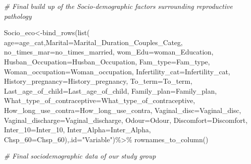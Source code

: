 \documentclass[
]{article}
\newenvironment{Shaded}{\begin{snugshade}}{\end{snugshade}}
\newcommand{\AttributeTok}[1]{\textcolor[rgb]{0.77,0.63,0.00}{#1}}
\newcommand{\CommentTok}[1]{\textcolor[rgb]{0.56,0.35,0.01}{\textit{#1}}}
\newcommand{\FunctionTok}[1]{\textcolor[rgb]{0.00,0.00,0.00}{#1}}
\newcommand{\NormalTok}[1]{#1}
\newcommand{\OtherTok}[1]{\textcolor[rgb]{0.56,0.35,0.01}{#1}}
\newcommand{\SpecialCharTok}[1]{\textcolor[rgb]{0.00,0.00,0.00}{#1}}
\newcommand{\StringTok}[1]{\textcolor[rgb]{0.31,0.60,0.02}{#1}}
\begin{document}
\begin{Shaded}
\begin{Highlighting}[]
\CommentTok{\# Final build up of the Socio{-}demographic factors surrounding reproductive pathology}

\NormalTok{Socio\_eco}\OtherTok{\textless{}{-}}\FunctionTok{bind\_rows}\NormalTok{(}\FunctionTok{list}\NormalTok{(}
  \AttributeTok{age=}\NormalTok{age\_cat,}\AttributeTok{Marital=}\NormalTok{Marital\_Duration\_Couples\_Categ,}
  \AttributeTok{no\_times\_mar=}\NormalTok{no\_times\_married,}
  \AttributeTok{wom\_Edu=}\NormalTok{woman\_Education,}
  \AttributeTok{Husban\_Occupation=}\NormalTok{Husban\_Occupation,}
  \AttributeTok{Fam\_type=}\NormalTok{Fam\_type,}
  \AttributeTok{Woman\_occupation=}\NormalTok{Woman\_occupation,}
  \AttributeTok{Infertility\_cat=}\NormalTok{Infertility\_cat,}
  \AttributeTok{History\_pregnancy=}\NormalTok{History\_pregnancy,}
  \AttributeTok{To\_term=}\NormalTok{To\_term,}
  \AttributeTok{Last\_age\_of\_child=}\NormalTok{Last\_age\_of\_child,}
  \AttributeTok{Family\_plan=}\NormalTok{Family\_plan,}
  \AttributeTok{What\_type\_of\_contraceptive=}\NormalTok{What\_type\_of\_contraceptive,}
  \AttributeTok{How\_long\_use\_contra=}\NormalTok{How\_long\_use\_contra,}
  \AttributeTok{Vaginal\_disc=}\NormalTok{Vaginal\_disc,}
  \AttributeTok{Vaginal\_discharge=}\NormalTok{Vaginal\_discharge,}
  \AttributeTok{Odour=}\NormalTok{Odour,}
  \AttributeTok{Discomfort=}\NormalTok{Discomfort,}
  \AttributeTok{Inter\_10=}\NormalTok{Inter\_10,}
  \AttributeTok{Inter\_Alpha=}\NormalTok{Inter\_Alpha,}
  \AttributeTok{Chsp\_60=}\NormalTok{Chsp\_60),}\AttributeTok{.id=}\StringTok{"Variable"}\NormalTok{)}\SpecialCharTok{\%\textgreater{}\%}
  \FunctionTok{rownames\_to\_column}\NormalTok{()}

\CommentTok{\# Final sociodemographic data of our study group}


\end{Highlighting}
\end{Shaded}
\end{document}
